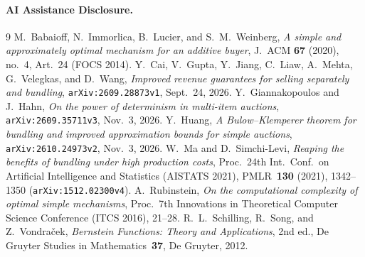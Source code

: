 \paragraph{AI Assistance Disclosure.}
\PaperAIDisclosure

\begin{thebibliography}{9}
 M.~Babaioff, N.~Immorlica, B.~Lucier, and S.~M.~Weinberg, \emph{A simple and approximately optimal mechanism for an additive buyer}, J.\ ACM \textbf{67} (2020), no.~4, Art.~24 (FOCS 2014).
 Y.~Cai, V.~Gupta, Y.~Jiang, C.~Liaw, A.~Mehta, G.~Velegkas, and D.~Wang, \emph{Improved revenue guarantees for selling separately and bundling}, \texttt{arXiv:2609.28873v1}, Sept.\ 24, 2026.
 Y.~Giannakopoulos and J.~Hahn, \emph{On the power of determinism in multi-item auctions}, \texttt{arXiv:2609.35711v3}, Nov.\ 3, 2026.
 Y.~Huang, \emph{A Bulow--Klemperer theorem for bundling and improved approximation bounds for simple auctions}, \texttt{arXiv:2610.24973v2}, Nov.\ 3, 2026.
 W.~Ma and D.~Simchi-Levi, \emph{Reaping the benefits of bundling under high production costs}, Proc.\ 24th Int.\ Conf.\ on Artificial Intelligence and Statistics (AISTATS 2021), PMLR~\textbf{130} (2021), 1342--1350 (\texttt{arXiv:1512.02300v4}).
 A.~Rubinstein, \emph{On the computational complexity of optimal simple mechanisms}, Proc.\ 7th Innovations in Theoretical Computer Science Conference (ITCS 2016), 21--28.
 R.~L.~Schilling, R.~Song, and Z.~Vondra\v{c}ek, \emph{Bernstein Functions: Theory and Applications}, 2nd ed., De Gruyter Studies in Mathematics~\textbf{37}, De Gruyter, 2012.
\end{thebibliography}
